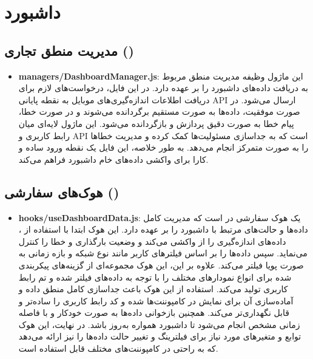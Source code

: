     \section{داشبورد}
    
    \subsection{مدیریت منطق تجاری ()}
    \begin{itemize}
    	\item \textbf{managers/DashboardManager.js}: این ماژول وظیفه مدیریت منطق مربوط به دریافت داده‌های داشبورد را بر عهده دارد.  
    	در این فایل، درخواست‌های لازم برای دریافت اطلاعات اندازه‌گیری‌های موبایل به نقطه پایانی API ارسال می‌شود.  
    	در صورت موفقیت، داده‌ها به صورت مستقیم برگردانده می‌شوند و در صورت خطا، پیام خطا به صورت دقیق پردازش و بازگردانده می‌شود.  
    	این ماژول لایه‌ای میان رابط کاربری و API است که به جداسازی مسئولیت‌ها کمک کرده و مدیریت خطاها را به صورت متمرکز انجام می‌دهد.  
    	به طور خلاصه، این فایل یک نقطه ورود ساده و کارا برای واکشی داده‌های خام داشبورد فراهم می‌کند.  
    \end{itemize}
    
    \subsection{هوک‌های سفارشی ()}
    \begin{itemize}
    	\item \textbf{hooks/useDashboardData.js}: یک هوک سفارشی در  است که مدیریت کامل داده‌ها و حالت‌های مرتبط با داشبورد را بر عهده دارد.  
    	این هوک ابتدا با استفاده از ، داده‌های اندازه‌گیری را از  واکشی می‌کند و وضعیت بارگذاری و خطا را کنترل می‌نماید.  
    	سپس داده‌ها را بر اساس فیلترهای کاربر مانند نوع شبکه و بازه زمانی به صورت پویا فیلتر می‌کند.  
    	علاوه بر این، این هوک مجموعه‌ای از گزینه‌های پیکربندی شده برای انواع نمودارهای مختلف را با توجه به داده‌های فیلتر شده و تم رابط کاربری تولید می‌کند.  
    	استفاده از این هوک باعث جداسازی کامل منطق داده و آماده‌سازی آن برای نمایش در کامپوننت‌ها شده و کد رابط کاربری را ساده‌تر و قابل نگهداری‌تر می‌کند.  
    	همچنین بازخوانی داده‌ها به صورت خودکار و با فاصله زمانی مشخص انجام می‌شود تا داشبورد همواره به‌روز باشد.  
    	در نهایت، این هوک توابع و متغیرهای مورد نیاز برای فیلترینگ و تغییر حالت داده‌ها را نیز ارائه می‌دهد که به راحتی در کامپوننت‌های مختلف قابل استفاده است.
    \end{itemize}
    
